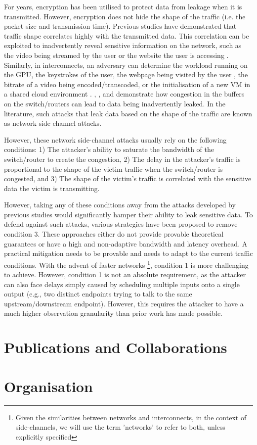 For years, encryption has been utilised to protect data from leakage when it is transmitted. 
However, encryption does not hide the shape of the traffic (i.e. the packet size and transmission time).
Previous studies have demonstrated that traffic shape correlates highly with the transmitted data. 
This correlation can be exploited to inadvertently reveal sensitive information on the network, such as the video being streamed by the user \cite{schuster2017beautyburst} or the website the user is accessing \cite{bhat2019varcnn, wang2014supersequence}. 
Similarly, in interconnects, an adversary can determine the workload running on the GPU, the keystrokes of the user, the webpage being visited by the user \cite{tan2021invisible}, the bitrate of a video being encoded/transcoded, or the initialisation of a new VM in a shared cloud environment \cite{giechaskiel2022cross}. 
\citet{schuster2017beautyburst}, \citet{tan2021invisible}, and \cite{giechaskiel2022cross} demonstrate how congestion in the buffers on the switch/routers can lead to data being inadvertently leaked. 
In the literature, such attacks that leak data based on the shape of the traffic are known as network side-channel attacks.

However, these network side-channel attacks usually rely on the following conditions: 
1) The attacker's ability to saturate the bandwidth of the switch/router to create the congestion,
2) The delay in the attacker's traffic is proportional to the shape of the victim traffic when the switch/router is congested, and
3) The shape of the victim's traffic is correlated with the sensitive data the victim is transmitting.

However, taking any of these conditions away from the attacks developed by previous studies would significantly hamper their ability to leak sensitive data. 
To defend against such attacks, various strategies have been proposed to remove condition 3.
These approaches either do not provide provable theoretical guarantees or have a high and non-adaptive bandwidth and latency overhead.
A practical mitigation needs to be provable and needs to adapt to the current traffic conditions.
With the advent of faster networks
\footnote{Given the similarities between networks and interconnects, in the context of side-channels, we will use the term 'networks' to refer to both, unless explicitly specified},
condition 1 is more challenging to achieve.
However, condition 1 is not an absolute requirement, as the attacker can also face delays simply caused by scheduling multiple inputs onto a single output (e.g., two distinct endpoints trying to talk to the same upstream/downstream endpoint). However, this requires the attacker to have a much higher observation granularity than prior work has made possible.



\section{Publications and Collaborations}\label{sec:collabs}
\section{Organisation}\label{sec:org}
\endinput
